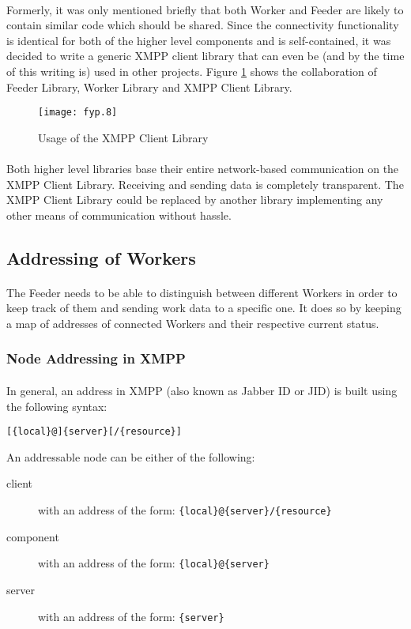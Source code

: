 \paragraph{}
Formerly, it was only mentioned briefly that both Worker and Feeder are likely to contain similar code which should be shared. Since the connectivity functionality is identical for both of the higher level components and is self-contained, it was decided to write a generic XMPP client library that can even be (and by the time of this writing is) used in other projects. Figure \ref{fig:justification} shows the collaboration of Feeder Library, Worker Library and XMPP Client Library.

\begin{figure}[H]
\begin{center}
\texttt{[image: fyp.8]}
\end{center}
\caption{Usage of the XMPP Client Library}
\label{fig:justification}
\end{figure}

\paragraph{}
Both higher level libraries base their entire network-based communication on the XMPP Client Library. Receiving and sending data is completely transparent. The XMPP Client Library could be replaced by another library implementing any other means of communication without hassle.

\subsection{Addressing of Workers}
\paragraph{}
The Feeder needs to be able to distinguish between different Workers in order to keep track of them and sending work data to a specific one. It does so by keeping a map of addresses of connected Workers and their respective current status.

\subsubsection{Node Addressing in XMPP}
\paragraph{}
In general, an address in XMPP (also known as Jabber ID or JID) is built using the following syntax:
\begin{center}
\texttt{[\{local\}@]\{server\}[/\{resource\}]}
\end{center}
An addressable node can be either of the following:
\begin{description}
\item[client] with an address of the form: \texttt{\{local\}@\{server\}/\{resource\}}
\item[component] with an address of the form: \texttt{\{local\}@\{server\}} 
\item[server] with  an address of the form: \texttt{\{server\}}
\end{description}
